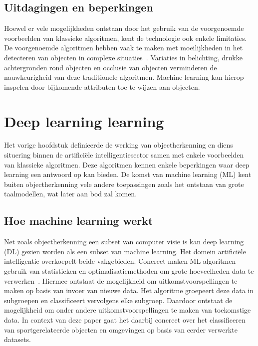 \subsection{Uitdagingen en beperkingen}
\label{subsec:uitdagingen-en-beperkingen}
Hoewel er vele mogelijkheden ontstaan door het gebruik van de voorgenoemde voorbeelden van klassieke algoritmen, kent de technologie ook enkele limitaties.
De voorgenoemde algoritmen hebben vaak te maken met moeilijkheden in het detecteren van objecten in complexe situaties~\autocite{Luz2024}.
Variaties in belichting, drukke achtergronden rond objecten en occlusie van objecten verminderen de nauwkeurigheid van deze traditionele algoritmen.
Machine learning kan hierop inspelen door bijkomende attributen toe te wijzen aan objecten.

\section{Deep learning learning}\label{sec:datasets}
Het vorige hoofdstuk definieerde de werking van objectherkenning en diens situering binnen de artifici\"ele intelligentiesector samen met enkele voorbeelden van klassieke algoritmen.
Deze algoritmen kennen enkele beperkingen waar deep learning een antwoord op kan bieden.
De komst van machine learning (ML) kent buiten objectherkenning vele andere toepassingen zoals het ontstaan van grote taalmodellen, wat later aan bod zal komen.

\subsection{Hoe machine learning werkt}
\label{subsec:hoe-deep-learning-werkt}
Net zoals objectherkenning een subset van computer visie is kan deep learning (DL) gezien worden als een subset van machine learning.
Het domein artifici\"ele intelligentie overkoepelt beide vakgebieden.
Concreet maken ML-algoritmen gebruik van statistieken en optimalisatiemethoden om grote hoeveelheden data te verwerken~\autocite{Pennone2024}.
Hiermee ontstaat de mogelijkheid om uitkomstvoorspellingen te maken op basis van invoer van nieuwe data.
Het algoritme groepeert deze data in subgroepen en classificeert vervolgens elke subgroep.
Daardoor ontstaat de mogelijkheid om onder andere uitkomstvoorspellingen te maken van toekomstige data.
In context van deze paper gaat het daarbij concreet over het classificeren van sportgerelateerde objecten en omgevingen op basis van eerder verwerkte datasets.

